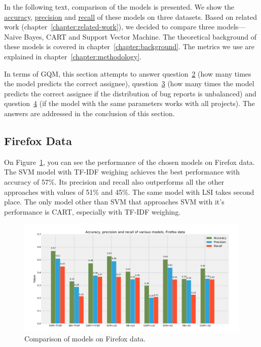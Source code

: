 In the following text, comparison of the models is presented. We show the \hyperlink{metric:a}{accuracy}, \hyperlink{metric:p}{precision} and \hyperlink{metric:r}{recall} of these models on three datasets. Based on related work (chapter~\ref{chapter:related-work}), we decided to compare three models---Naive Bayes, CART and Support Vector Machine. The theoretical background of these models is covered in chapter~\ref{chapter:background}. The metrics we use are explained in chapter~\ref{chapter:methodology}.

In terms of GQM, this section attempts to answer question~\hyperlink{question:2}{2} (how many times the model predicts the correct assignee), question~\hyperlink{question:3}{3} (how many times the model predicts the correct assignee if the distribution of bug reports is unbalanced) and question~\hyperlink{question:4}{4} (if the model with the same parameters works with all projects). The answers are addressed in the conclusion of this section.

\subsection{Firefox Data}

On Figure~\ref{fig:results.models.firefox}, you can see the performance of the chosen models on Firefox data. The SVM model with TF-IDF weighing achieves the best performance with accuracy of 57\%. Its precision and recall also outperforms all the other approaches with values of 51\% and 45\%. The same model with LSI takes second place. The only model other than SVM that approaches SVM with it's performance is CART, especially with TF-IDF weighing.

\begin{figure}[htbp]
    \centering
        \includegraphics[width=\textwidth]{./images/comparison_of_models/firefox.pdf}
    \caption{Comparison of models on Firefox data.}
    \label{fig:results.models.firefox}
\end{figure}

